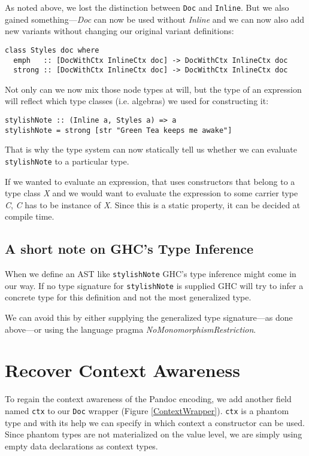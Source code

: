 As noted above, we lost the distinction between \texttt{Doc} and
\texttt{Inline}. But we also gained something—\emph{Doc} can now be used
without \emph{Inline} and we can now also add new variants without changing our
original variant definitions:

\begin{lstlisting}
class Styles doc where
  emph   :: [DocWithCtx InlineCtx doc] -> DocWithCtx InlineCtx doc
  strong :: [DocWithCtx InlineCtx doc] -> DocWithCtx InlineCtx doc
\end{lstlisting}

Not only can we now mix those node types at will, but the type of an expression
will reflect which type classes (i.e. algebras) we used for constructing it:

\begin{lstlisting}
stylishNote :: (Inline a, Styles a) => a
stylishNote = strong [str "Green Tea keeps me awake"]
\end{lstlisting}

That is why the type system can now statically tell us whether we can evaluate
\texttt{stylishNote} to a particular type.

If we wanted to evaluate an expression, that uses constructors that belong to a
type class \emph{X} and we would want to evaluate the expression to some carrier
type \emph{C}, \emph{C} has to be instance of \emph{X}. Since this is a static
property, it can be decided at compile time.

\subsection{A short note on GHC’s Type Inference}

When we define an AST like \texttt{stylishNote} GHC’s type inference might come
in our way. If no type signature for \texttt{stylishNote} is supplied GHC will
try to infer a concrete type for this definition and not the most generalized
type.

We can avoid this by either supplying the generalized type signature—as done
above—or using the language pragma \emph{NoMonomorphismRestriction}.

\section{Recover Context Awareness}
\label{sec:org5ba4b2b}

To regain the context awareness of the Pandoc encoding, we add another field
named \texttt{ctx} to our \texttt{Doc} wrapper (Figure \ref{ContextWrapper}).
\texttt{ctx} is a phantom type and with its help we can specify in which
context a constructor can be used. Since phantom types are not materialized on
the value level, we are simply using empty data declarations as context types.

